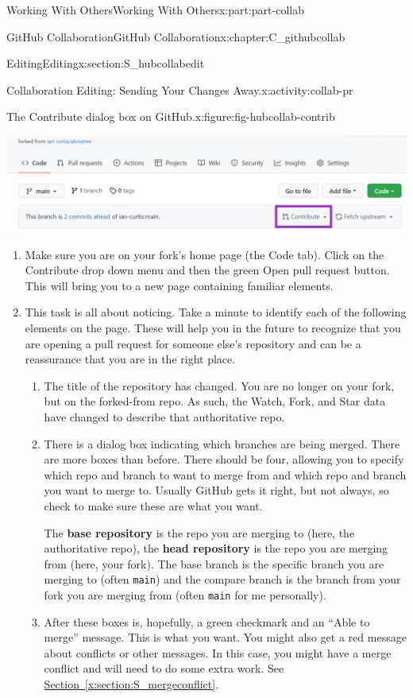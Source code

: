\documentclass[oneside,10pt,]{book}
\newcommand{\xreffont}{\relax}
\newcommand{\mono}[1]{\texttt{#1}}
\newcommand{\terminology}[1]{\textbf{#1}}
\begin{document}
\begin{partptx}{Working With Others}{}{Working With Others}{}{}{x:part:part-collab}
\begin{chapterptx}{GitHub Collaboration}{}{GitHub Collaboration}{}{}{x:chapter:C_githubcollab}
\begin{sectionptx}{Editing}{}{Editing}{}{}{x:section:S_hubcollabedit}
\begin{activity}{Collaboration Editing: Sending Your Changes Away.}{x:activity:collab-pr}
\begin{figureptx}{The Contribute dialog box on GitHub.}{x:figure:fig-hubcollab-contrib}{}%
\begin{image}{0.025}{0.95}{0.025}%
\includegraphics[width=\linewidth]{external/hubcollab_contrib.pdf}
\end{image}%
\tcblower
\end{figureptx}%
\begin{enumerate}[font=\bfseries,label=(\alph*),ref=\alph*]
\item{}Make sure you are on your fork's home page (the Code tab). Click on the Contribute drop down menu and then the green Open pull request button. This will bring you to a new page containing familiar elements.%
\item{}This task is all about noticing. Take a minute to identify each of the following elements on the page. These will help you in the future to recognize that you are opening a pull request for someone else's repository and can be a reassurance that you are in the right place.%
\begin{enumerate}
\item{}The title of the repository has changed. You are no longer on your fork, but on the forked-from repo. As such, the Watch, Fork, and Star data have changed to describe that authoritative repo.%
\item{}There is a dialog box indicating which branches are being merged. There are more boxes than before. There should be four, allowing you to specify which repo and branch to want to merge from and which repo and branch you want to merge to. Usually GitHub gets it right, but not always, so check to make sure these are what you want.%
\par
The \terminology{base repository} is the repo you are merging to (here, the authoritative repo), the \terminology{head repository} is the repo you are merging from (here, your fork). The base branch is the specific branch you are merging to (often \mono{main}) and the compare branch is the branch from your fork you are merging from (often \mono{main} for me personally).%
\item{}After these boxes is, hopefully, a green checkmark and an ``Able to merge'' message. This is what you want. You might also get a red message about conflicts or other messages. In this case, you might have a merge conflict and will need to do some extra work. See \hyperref[x:section:S_mergeconflict]{Section~{\xreffont\ref{x:section:S_mergeconflict}}}.%

\end{enumerate}
\end{enumerate}
\end{activity}
\end{sectionptx}
\end{chapterptx}
\end{partptx}
\end{document}
